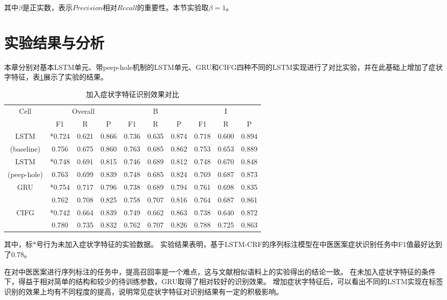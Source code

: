 其中$\beta$是正实数，表示$Precision$相对$Recall$的重要性。本节实验取$\beta = 1$。

\section{实验结果与分析}
本章分别对基本LSTM单元、带peep-hole机制的LSTM单元、GRU和CIFG四种不同的LSTM实现进行了对比实验，并在此基础上增加了症状字特征，表\ref{tab:tab1}展示了实验的结果。
\begin{table}[H]
    \centering
    \caption{加入症状字特征识别效果对比}
    \begin{tabular}{cccccccccc}
        \toprule
            \multirow{2}{*}{Cell} &\multicolumn{3}{c}{Overall} &\multicolumn{3}{c}{B} &\multicolumn{3}{c}{I}\\
            \cmidrule(lr){2-4} \cmidrule(lr){5-7} \cmidrule(lr){8-10}
            & F1 & R & P & F1 & R & P & F1 & R & P\\
        \midrule
            LSTM & *0.724 & 0.621 & 0.866 & 0.736 & 0.635 & 0.874 & 0.718 & 0.600 & 0.894\\
            (baseline) & 0.756 & 0.675 & 0.860 & 0.763 & 0.685 & 0.862 & 0.753 & 0.653 & 0.889\\
            LSTM & *0.748 & 0.691 & 0.815 & 0.746 & 0.689 & 0.812 & 0.748 & 0.670 & 0.848\\
            (peep-hole) & 0.763 & 0.699 & 0.839 & 0.748 & 0.685 & 0.824 & 0.769 & 0.687 & 0.873\\
            \multirow{2}{2cm}{GRU} & *0.754 & 0.717 & 0.796 & 0.738 & 0.689 & 0.794 & 0.761 & 0.698 & 0.835\\
                                 & 0.762 & 0.708 & 0.825 & 0.758 & 0.707 & 0.816 & 0.764 & 0.687 & 0.861\\
            \multirow{2}{2cm}{CIFG} & *0.742 & 0.664 & 0.839 & 0.749 & 0.662 & 0.863 & 0.738 & 0.640 & 0.872\\
                                  & 0.780 & 0.735 & 0.832 & 0.762 & 0.707 & 0.826 & 0.788 & 0.725 & 0.863\\
        \bottomrule
    \end{tabular}
    \label{tab:tab1}
\end{table}
其中，标$*$号行为未加入症状字特征的实验数据。
实验结果表明，基于LSTM-CRF的序列标注模型在中医医案症状识别任务中F1值最好达到了0.78。

在对中医医案进行序列标注的任务中，提高召回率是一个难点，这与文献相似语料上的实验得出的结论一致。
在未加入症状字特征的条件下，得益于相对简单的结构和较少的待训练参数，GRU取得了相对较好的识别效果。
增加症状字特征后，可以看出不同的LSTM实现在标签识别的效果上均有不同程度的提高，说明常见症状字特征对识别结果有一定的积极影响。

